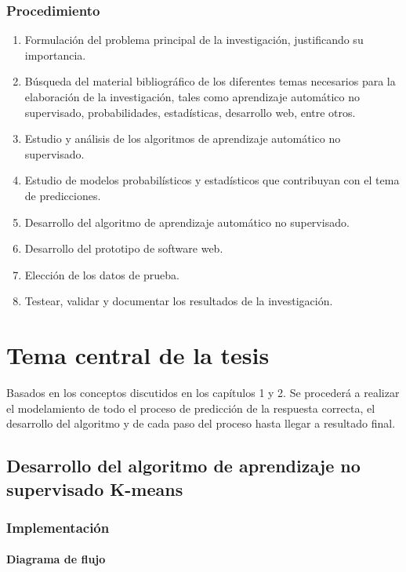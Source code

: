 \subsection{Procedimiento}

\begin{enumerate}
	\item Formulación del problema principal de la investigación, justificando su importancia.
	\item Búsqueda del material bibliográfico de los diferentes temas necesarios para la elaboración de la investigación, tales como aprendizaje automático no supervisado, probabilidades, estadísticas, desarrollo web, entre otros.
	\item Estudio y análisis de los algoritmos de aprendizaje automático no supervisado.
	\item Estudio de modelos probabilísticos y estadísticos que contribuyan con el tema de predicciones.
	\item Desarrollo del algoritmo de aprendizaje automático no supervisado.
	\item Desarrollo del prototipo de software web.
	\item Elección de los datos de prueba.
	\item Testear, validar y documentar los resultados de la investigación.
\end{enumerate}




\chapter{Tema central de la tesis}

Basados en los conceptos discutidos en los capítulos 1 y 2. Se procederá a realizar el modelamiento de todo el proceso de predicción de la respuesta correcta, el desarrollo del algoritmo y de cada paso del proceso hasta llegar a resultado final.

\section{Desarrollo del algoritmo de aprendizaje no supervisado K-means} 

\subsection{Implementación}

\subsubsection{Diagrama de flujo}

